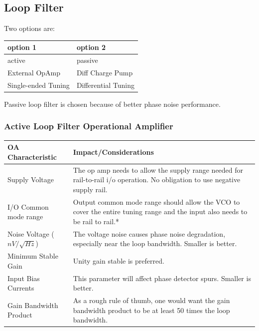 \documentclass{article}
\begin{document}
\subsection{Loop Filter}

Two options are:

\begin{table}[!ht]
    \centering
    \begin{tabular}{|l|l|}
    \hline
		option 1 & option 2 \\ \hline
        active & passive \\ \hline
        External OpAmp & Diff Charge Pump \\ \hline
        Single-ended Tuning & Differential Tuning \\ \hline
    \end{tabular}
\end{table}

Passive loop filter is chosen because of better phase noise performance.

\subsubsection*{Active Loop Filter Operational Amplifier}

\begin{table}[!ht]
    \centering
    \begin{tabular}{|l|p{100mm}|}
    \hline
        OA Characteristic & Impact/Considerations \\ \hline
        Supply Voltage & The op amp needs to allow the supply range needed for rail-to-rail i/o operation. No obligation to use negative supply rail. \\ \hline
        I/O Common mode range & Output common mode range should allow the VCO to cover the entire tuning range and the input also needs to be rail to rail.* \\ \hline
        Noise Voltage ($nV/\sqrt{Hz}$) & The voltage noise causes phase noise degradation, especially near the loop bandwidth. Smaller is better. \\ \hline
        Minimum Stable Gain & Unity gain stable is preferred. \\ \hline
        Input Bias Currents & This parameter will affect phase detector spurs. Smaller is better. \\ \hline
        Gain Bandwidth Product & As a rough rule of thumb, one would want the gain bandwidth product to be at least 50 times the loop bandwidth. 
		\\ \hline
    \end{tabular}
\end{table}
\end{document}
